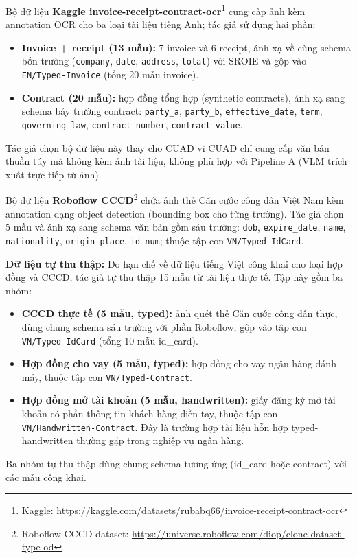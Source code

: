 ﻿\documentclass[12pt]{report}
\begin{document}
Bộ dữ liệu \textbf{Kaggle invoice-receipt-contract-ocr}\footnote{Kaggle: \url{https://kaggle.com/datasets/rubabq66/invoice-receipt-contract-ocr}}
cung cấp ảnh kèm annotation OCR cho ba loại tài liệu tiếng Anh; tác giả sử dụng hai phần:
\begin{itemize}
    \item \textbf{Invoice + receipt (13 mẫu):} 7 invoice và 6 receipt, ánh xạ về cùng
    schema bốn trường (\texttt{company}, \texttt{date}, \texttt{address}, \texttt{total})
    với SROIE và gộp vào \texttt{EN/Typed-Invoice} (tổng 20 mẫu invoice).
    \item \textbf{Contract (20 mẫu):} hợp đồng tổng hợp (synthetic contracts), ánh xạ sang
    schema bảy trường contract: \texttt{party\_a}, \texttt{party\_b}, \texttt{effective\_date},
    \texttt{term}, \texttt{governing\_law}, \texttt{contract\_number}, \texttt{contract\_value}.
\end{itemize}
Tác giả chọn bộ dữ liệu này thay cho CUAD\cite{hendrycks2021cuad} vì CUAD chỉ cung cấp văn
bản thuần túy mà không kèm ảnh tài liệu, không phù hợp với Pipeline A (VLM trích xuất trực
tiếp từ ảnh).

Bộ dữ liệu \textbf{Roboflow CCCD}\footnote{Roboflow CCCD dataset: \url{https://universe.roboflow.com/diop/clone-dataset-type-od}}
chứa ảnh thẻ Căn cước công dân Việt Nam kèm annotation dạng object detection (bounding box
cho từng trường). Tác giả chọn 5 mẫu và ánh xạ sang schema văn bản gồm sáu trường:
\texttt{dob}, \texttt{expire\_date}, \texttt{name}, \texttt{nationality},
\texttt{origin\_place}, \texttt{id\_num}; thuộc tập con \texttt{VN/Typed-IdCard}.

\textbf{Dữ liệu tự thu thập:} Do hạn chế về dữ liệu tiếng Việt công khai cho loại hợp đồng và CCCD, tác giả tự thu thập
15 mẫu từ tài liệu thực tế. Tập này gồm ba nhóm:
\begin{itemize}
    \item \textbf{CCCD thực tế (5 mẫu, typed):} ảnh quét thẻ Căn cước công dân thực, dùng
    chung schema sáu trường với phần Roboflow; gộp vào tập con \texttt{VN/Typed-IdCard}
    (tổng 10 mẫu id\_card).
    \item \textbf{Hợp đồng cho vay (5 mẫu, typed):} hợp đồng cho vay ngân hàng đánh máy,
    thuộc tập con \texttt{VN/Typed-Contract}.
    \item \textbf{Hợp đồng mở tài khoản (5 mẫu, handwritten):} giấy đăng ký mở tài khoản có
    phần thông tin khách hàng điền tay, thuộc tập con \texttt{VN/Handwritten-Contract}.
    Đây là trường hợp tài liệu hỗn hợp typed-handwritten thường gặp trong nghiệp vụ ngân hàng.
\end{itemize}
Ba nhóm tự thu thập dùng chung schema tương ứng (id\_card hoặc contract) với các mẫu công khai.
\end{document}
